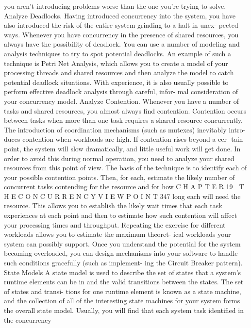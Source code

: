 you aren’t introducing problems worse than the one you’re trying to solve.
Analyze Deadlocks. Having introduced concurrency into the system, you
have also introduced the risk of the entire system grinding to a halt in unex-
pected ways. Whenever you have concurrency in the presence of shared
resources, you always have the possibility of deadlock. You can use a number
of modeling and analysis techniques to try to spot potential deadlocks. An
example of such a technique is Petri Net Analysis, which allows you to create
a model of your processing threads and shared resources and then analyze
the model to catch potential deadlock situations. With experience, it is also
usually possible to perform effective deadlock analysis through careful, infor-
mal consideration of your concurrency model.
Analyze Contention. Whenever you have a number of tasks and shared
resources, you almost always find contention. Contention occurs between
tasks when more than one task requires a shared resource concurrently. The
introduction of coordination mechanisms (such as mutexes) inevitably intro-
duces contention when workloads are high. If contention rises beyond a cer-
tain point, the system will slow dramatically, and little useful work will get
done. In order to avoid this during normal operation, you need to analyze
your shared resources from this point of view. The basis of the technique is to
identify each of your possible contention points. Then, for each, estimate the
likely number of concurrent tasks contending for the resource and for how
C H A P T E R 19  T H E C O N C U R R E N C Y V I E W P O I N T
 347
long each will need the resource. This allows you to establish the likely wait
times that each task experiences at each point and then to estimate how such
contention will affect your processing times and throughput. Repeating the
exercise for different workloads allows you to estimate the maximum theoret-
ical workloads your system can possibly support. Once you understand the
potential for the system becoming overloaded, you can design mechanisms
into your software to handle such conditions gracefully (such as implement-
ing the Circuit Breaker pattern).
State Models
A state model is used to describe the set of states that a system’s runtime elements
can be in and the valid transitions between the states. The set of states and transi-
tions for one runtime element is known as a state machine, and the collection of all
of the interesting state machines for your system forms the overall state model.
Usually, you will find that each system task identified in the concurrency
